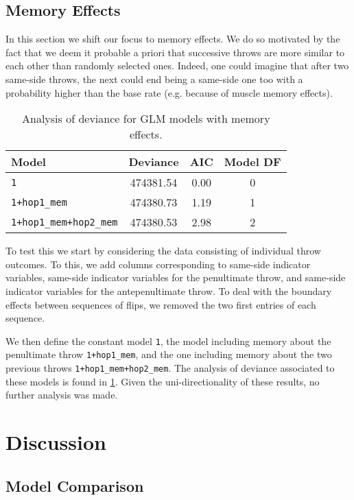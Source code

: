 \documentclass[a4paper, 12pt,oneside]{article}
\begin{document}
		\subsection{Memory Effects}
			In this section we shift our focus to memory effects. We do so motivated by the fact that we deem it probable a priori that successive throws are more similar to each other than randomly selected ones. Indeed, one could imagine that after two same-side throws, the next could end being a same-side one too with a probability higher than the base rate (e.g. because of muscle memory effects). 
			\begin{table}[htb]
				\centering
				\caption{Analysis of deviance for GLM models with memory effects.}
				\label{tab:memory-model-comparison}
				\begin{tabular}{lccc}
				\toprule
				Model & Deviance & AIC & Model DF \\
				\midrule
				\texttt{1} & 474381.54 & 0.00 & 0 \\
				\texttt{1+hop1\_mem} & 474380.73 & 1.19 & 1 \\
				\texttt{1+hop1\_mem+hop2\_mem} & 474380.53 & 2.98 & 2 \\
				\bottomrule
				\end{tabular}
			\end{table}

			To test this we start by considering the data consisting of individual throw outcomes. To this, we add columns corresponding to same-side indicator variables, same-side indicator variables for the penultimate throw, and same-side indicator variables for the antepenultimate throw.
			To deal with the boundary effects between sequences of flips, we removed the two first entries of each sequence. 
			
			We then define the constant model \texttt{1}, the model including memory about the penultimate throw \texttt{1+hop1\_mem}, and the one including memory about the two previous throws \texttt{1+hop1\_mem+hop2\_mem}. The analysis of deviance associated to these models is found in \ref{tab:memory-model-comparison}. Given the uni-directionality of these results, no further analysis was made.  
	\section{Discussion}
		\subsection{Model Comparison}
\end{document}
